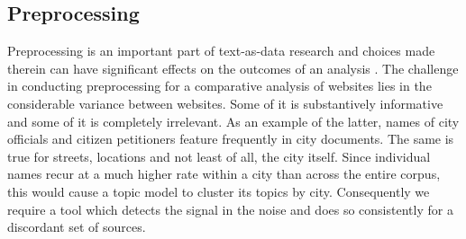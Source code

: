 \documentclass[11pt]{article}
\begin{document}


\subsection{Preprocessing}
Preprocessing is an important part of text-as-data research and choices made therein can have significant effects on the outcomes of an analysis \citep{denny2018text}. The challenge in conducting preprocessing for a comparative analysis of websites lies in the considerable variance between websites. Some of it is substantively informative and some of it is completely irrelevant. As an example of the latter, names of city officials and citizen petitioners feature frequently in city documents. The same is true for streets, locations and not least of all, the city itself. Since individual names recur at a much higher rate within a city than across the entire corpus, this would cause a topic model to cluster its topics by city. Consequently we require a tool which detects the signal in the noise and does so consistently for a discordant set of sources.

\end{document}
